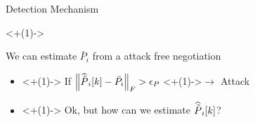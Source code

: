 \documentclass[aspectratio=169]{beamer}
\begin{document}
\begin{frame}{Detection Mechanism}

  \vspace{-.5cm}
  \onslide<+(1)->{
    \begin{assumption}
      We can estimate $\bar{P}_{i}$ from a attack free negotiation
    \end{assumption}
  }

  \begin{itemize}
    \item<+(1)-> If $\left\lVert\widehat{\tilde{P}}_{i}[k]-\bar{{P}}_{i}\right\rVert_{F}>\epsilon_{P}$ \onslide<+(1)->{$\to$ Attack}
    \item<+(1)-> Ok, but how can we estimate $\widehat{\tilde{P}}_{i}[k]$?
  \end{itemize}
\end{frame}
\end{document}
